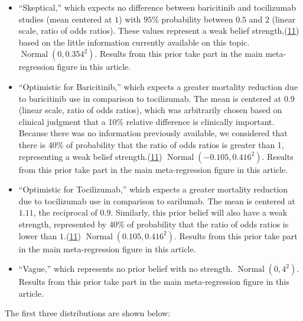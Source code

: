\documentclass[
  12pt,
]{article}
\begin{document}
\begin{itemize}
\item
  ``Skeptical,'' which expects no difference between baricitinib and
  tocilizumab studies (mean centered at \(1\)) with \(95\%\) probability
  between \(0.5\) and \(2\) (linear scale, ratio of odds ratios). These
  values represent a weak belief
  strength,(\protect\hyperlink{ref-zampieri2021}{11}) based on the
  little information currently available on this topic.
  \(\operatorname{Normal}(0, 0.354^2)\). Results from this prior take
  part in the main meta-regression figure in this article.
\item
  ``Optimistic for Baricitinib,'' which expects a greater mortality
  reduction due to baricitinib use in comparison to tocilizumab. The
  mean is centered at \(0.9\) (linear scale, ratio of odds ratios),
  which was arbitrarily chosen based on clinical judgment that a 10\%
  relative difference is clinically important. Because there was no
  information previously available, we considered that there is 40\% of
  probability that the ratio of odds ratios is greater than 1,
  representing a weak belief
  strength.(\protect\hyperlink{ref-zampieri2021}{11})
  \(\operatorname{Normal}(-0.105, 0.416^2)\). Results from this prior
  take part in the main meta-regression figure in this article.
\item
  ``Optimistic for Tocilizumab,'' which expects a greater mortality
  reduction due to tocilizumab use in comparison to sarilumab. The mean
  is centered at \(1.11\), the reciprocal of \(0.9\). Similarly, this
  prior belief will also have a weak strength, represented by 40\% of
  probability that the ratio of odds ratios is lower than
  \(1\).(\protect\hyperlink{ref-zampieri2021}{11})
  \(\operatorname{Normal}(0.105, 0.416^2)\). Results from this prior
  take part in the main meta-regression figure in this article.
\item
  ``Vague,'' which represents no prior belief with no strength.
  \(\operatorname{Normal}(0, 4^2)\). Results from this prior take part
  in the main meta-regression figure in this article.
\end{itemize}

The first three distributions are shown below:
\end{document}

